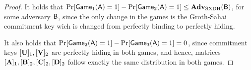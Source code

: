 \begin{proof}
It holds that $\Pr[\mathsf{Game}_1(\mathsf{A})=1]-\Pr[\mathsf{Game}_2(\mathsf{A})=1]\leq\mathbf{Adv}_\mathrm{SXDH}(\mathsf{B})$, for some adversary $\mathsf{B}$, since the only change in the games is the Groth-Sahai commitment key wich is changed from perfectly binding to perfectly hiding. %

It also holds that $\Pr[\mathsf{Game}_2(\mathsf{A})=1]-\Pr[\mathsf{Game}_3(\mathsf{A})=1]=0$, since commitment keys $[\mathbf{{U}}]_1,[\mathbf{{V}}]_2$ are perfectly hiding in both games, and hence, matrices $[\mathbf{{A}}]_1,[\mathbf{{B}}]_2,[\mathbf{{C}}]_2,[\mathbf{{D}}]_2$ follow exactly the same distribution in both games.


\end{proof}
